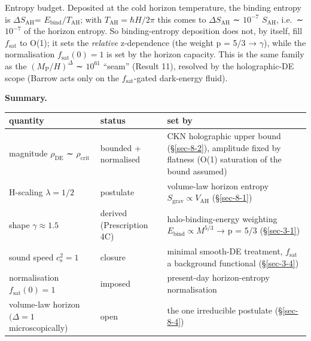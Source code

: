 \documentclass[preprint,12pt]{elsarticle}
\begin{document}
Entropy budget. Deposited at the cold horizon temperature, the binding
entropy is \(\Delta S_\mathrm{AH}\)=
\(E_{\mathrm{bind}}/T_\mathrm{AH}\); with
\(T_\mathrm{AH} = \hbar H/2\pi\) this comes to \(\Delta S_\mathrm{AH}\)
∼ \(10^{-7}\) \(S_\mathrm{AH}\), i.e.~∼\(10^{-7}\) of the horizon
entropy. So binding-entropy deposition does not, by itself, fill
\(f_{\mathrm{sat}}\) to O(1); it sets the \emph{relative} z-dependence
(the weight p = 5/3 → \(\gamma\)), while the normalisation
\(f_{\mathrm{sat}}(0) = 1\) is set by the horizon capacity. This is the
same family as the \((M_{\mathrm{P}}/H)^{\Delta }\) ∼ \(10^{61}\)
``seam'' (Result 11), resolved by the holographic-DE scope (Barrow acts
only on the \(f_{\mathrm{sat}}\)-gated dark-energy fluid).

\textbf{Summary.}

\begin{longtable}[]{@{}
  >{\raggedright\arraybackslash}p{}
  >{\raggedright\arraybackslash}p{}
  >{\raggedright\arraybackslash}p{}@{}}
\toprule\noalign{}
\begin{minipage}[b]{\linewidth}\raggedright
quantity
\end{minipage} & \begin{minipage}[b]{\linewidth}\raggedright
status
\end{minipage} & \begin{minipage}[b]{\linewidth}\raggedright
set by
\end{minipage} \\
\midrule\noalign{}
\endhead
\bottomrule\noalign{}
\endlastfoot
magnitude \(\rho _\mathrm{DE}\) ∼ \(\rho _{\mathrm{crit}}\) & bounded +
normalised & CKN holographic upper bound (§\ref{sec-8-2}), amplitude
fixed by flatness (O(1) saturation of the bound assumed) \\
H-scaling \(\lambda  = 1/2\) & postulate & volume-law horizon entropy
\(S_{\mathrm{grav}} \propto  V_\mathrm{AH}\) (§\ref{sec-8-1}) \\
shape \(\gamma  \approx  1.5\) & derived (Prescription 4C) &
halo-binding-energy weighting \(E_{\mathrm{bind}} \propto  M^{5/3}\) → p
= 5/3 (§\ref{sec-3-1}) \\
sound speed \(c_{\mathrm{s}}^{2} = 1\) & closure & minimal smooth-DE
treatment, \(f_{\mathrm{sat}}\) a background functional
(§\ref{sec-3-4}) \\
normalisation \(f_{\mathrm{sat}}(0) = 1\) & imposed & present-day
horizon-entropy normalisation \\
volume-law horizon \((\Delta  = 1\) microscopically) & open & the one
irreducible postulate (§\ref{sec-8-4}) \\
\end{longtable}
\end{document}
